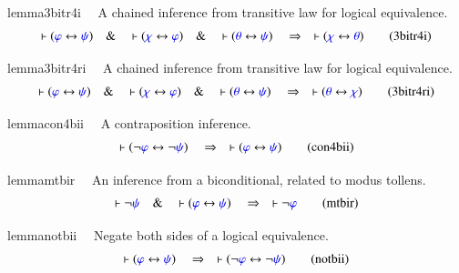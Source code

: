 \begin{restatable}{lemma}{3bitr4i}~~ A chained inference from transitive law for
logical equivalence. 
\begin{align}
\vdash ( \mw{\varphi} \leftrightarrow \mw{\psi} )\quad\&\quad \vdash (
    \mw{\chi} \leftrightarrow \mw{\varphi} )\quad\&\quad \vdash ( \mw{\theta}
    \leftrightarrow \mw{\psi} )\quad\Rightarrow\quad \vdash ( \mw{\chi}
    \leftrightarrow \mw{\theta} )\label{eq:3bitr4i}\tag{3bitr4i}
\end{align}
\end{restatable}

\begin{restatable}{lemma}{3bitr4ri}~~ A chained inference from transitive law
for logical equivalence.
\begin{align}
\vdash ( \mw{\varphi} \leftrightarrow \mw{\psi} )\quad\&\quad \vdash (
    \mw{\chi} \leftrightarrow \mw{\varphi} )\quad\&\quad \vdash ( \mw{\theta}
    \leftrightarrow \mw{\psi} )\quad\Rightarrow\quad \vdash ( \mw{\theta}
    \leftrightarrow \mw{\chi} )\label{eq:3bitr4ri}\tag{3bitr4ri}
\end{align}
\end{restatable}

\begin{restatable}{lemma}{con4bii}~~ A contraposition inference.  
\begin{align}
\vdash ( \lnot \mw{\varphi} \leftrightarrow \lnot \mw{\psi}
    )\quad\Rightarrow\quad \vdash ( \mw{\varphi} \leftrightarrow \mw{\psi}
    )\label{eq:con4bii}\tag{con4bii}
\end{align}
\end{restatable}

\begin{restatable}{lemma}{mtbir}~~ An inference from a biconditional, related to
modus tollens.
       ~  ~
\begin{align}
\vdash \lnot \mw{\psi}\quad\&\quad \vdash ( \mw{\varphi} \leftrightarrow
    \mw{\psi} )\quad\Rightarrow\quad \vdash \lnot
    \mw{\varphi}\label{eq:mtbir}\tag{mtbir}
\end{align}
\end{restatable}

\begin{restatable}{lemma}{notbii}~~ Negate both sides of a logical equivalence. 
~  ~
\begin{align}
\vdash ( \mw{\varphi} \leftrightarrow \mw{\psi} )\quad\Rightarrow\quad \vdash (
    \lnot \mw{\varphi} \leftrightarrow \lnot \mw{\psi}
    )\label{eq:notbii}\tag{notbii}
\end{align}
\end{restatable}


